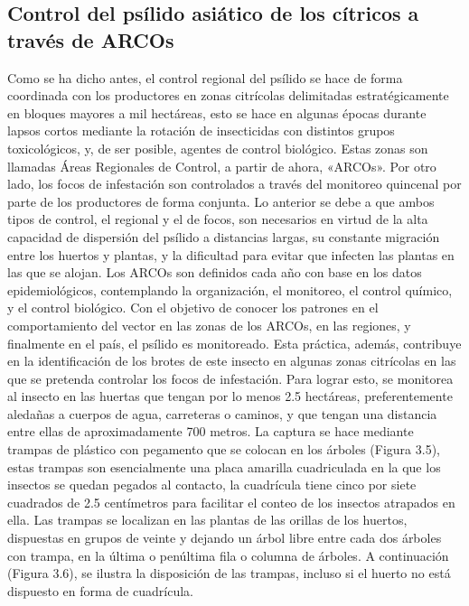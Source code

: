 \subsection{Control del psílido asiático de los cítricos a través de ARCOs}

Como se ha dicho antes, el control regional del psílido se hace de forma coordinada con los productores en zonas citrícolas delimitadas estratégicamente en bloques mayores a mil hectáreas, esto se hace en algunas épocas durante lapsos cortos mediante la rotación de insecticidas con distintos grupos toxicológicos, y, de ser posible, agentes de control biológico. Estas zonas son llamadas Áreas Regionales de Control, a partir de ahora, «ARCOs».  Por otro lado, los focos de infestación son controlados a través del monitoreo quincenal por parte de los productores de forma conjunta. Lo anterior se debe a que ambos tipos de control, el regional y el de focos, son necesarios en virtud de la alta capacidad de dispersión del psílido a distancias largas, su constante migración entre los huertos y plantas, y la dificultad para evitar que infecten las plantas en las que se alojan. Los ARCOs son definidos cada año con base en los datos epidemiológicos, contemplando la organización, el monitoreo, el control químico, y el control biológico.
Con el objetivo de conocer los patrones en el comportamiento del vector en las zonas de los ARCOs, en las regiones, y finalmente en el país, el  psílido es monitoreado. Esta práctica, además, contribuye en la identificación de los brotes de este insecto en algunas zonas citrícolas en las que se pretenda controlar los focos de infestación. Para lograr esto, se monitorea al insecto en las huertas que tengan por lo menos 2.5 hectáreas, preferentemente aledañas a cuerpos de agua, carreteras o caminos, y que tengan una distancia entre ellas de aproximadamente 700 metros. La captura se hace mediante trampas de plástico con pegamento que se colocan en los árboles (Figura 3.5), estas trampas son esencialmente una placa amarilla cuadriculada en la que los insectos se quedan pegados al contacto, la cuadrícula tiene cinco por siete cuadrados de 2.5 centímetros para facilitar el conteo de los insectos atrapados en ella. Las trampas se localizan en las plantas de las orillas de los huertos, dispuestas en grupos de veinte y dejando un árbol libre entre cada dos árboles con trampa, en la última o penúltima fila o columna de árboles. A continuación (Figura 3.6), se ilustra la disposición de las trampas, incluso si el huerto no está dispuesto en forma de cuadrícula.

